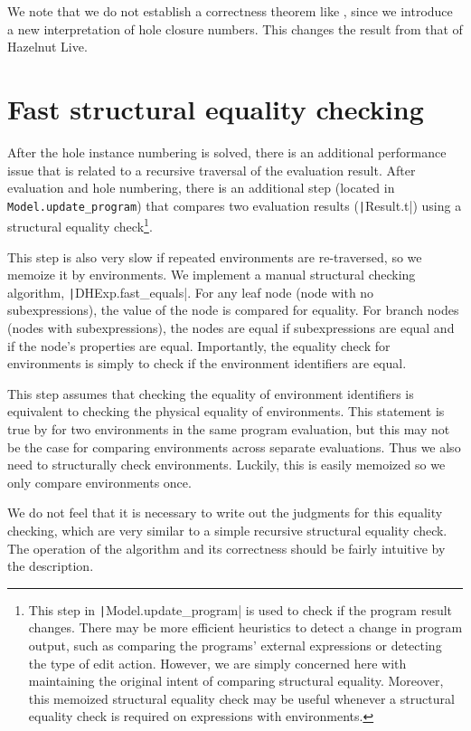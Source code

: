 We note that we do not establish a correctness theorem like , since we introduce a new interpretation of hole closure numbers. This changes the result from that of Hazelnut Live.

\section{Fast structural equality checking}
\label{sec:fast-equals}

After the hole instance numbering is solved, there is an additional performance issue that is related to a recursive traversal of the evaluation result. After evaluation and hole numbering, there is an additional step (located in \texttt{Model.update_program}) that compares two evaluation results (\texttt|Result.t|) using a structural equality check\footnote{This step in \texttt|Model.update_program| is used to check if the program result changes. There may be more efficient heuristics to detect a change in program output, such as comparing the programs' external expressions or detecting the type of edit action. However, we are simply concerned here with maintaining the original intent of comparing structural equality. Moreover, this memoized structural equality check may be useful whenever a structural equality check is required on expressions with environments.}.

This step is also very slow if repeated environments are re-traversed, so we memoize it by environments. We implement a manual structural checking algorithm, \texttt|DHExp.fast_equals|. For any leaf node (node with no subexpressions), the value of the node is compared for equality. For branch nodes (nodes with subexpressions), the nodes are equal if subexpressions are equal and if the node's properties are equal. Importantly, the equality check for environments is simply to check if the environment identifiers are equal.

This step assumes that checking the equality of environment identifiers is equivalent to checking the physical equality of environments. This statement is true by  for two environments in the same program evaluation, but this may not be the case for comparing environments across separate evaluations. Thus we also need to structurally check environments. Luckily, this is easily memoized so we only compare environments once.

We do not feel that it is necessary to write out the judgments for this equality checking, which are very similar to a simple recursive structural equality check. The operation of the algorithm and its correctness should be fairly intuitive by the description.

